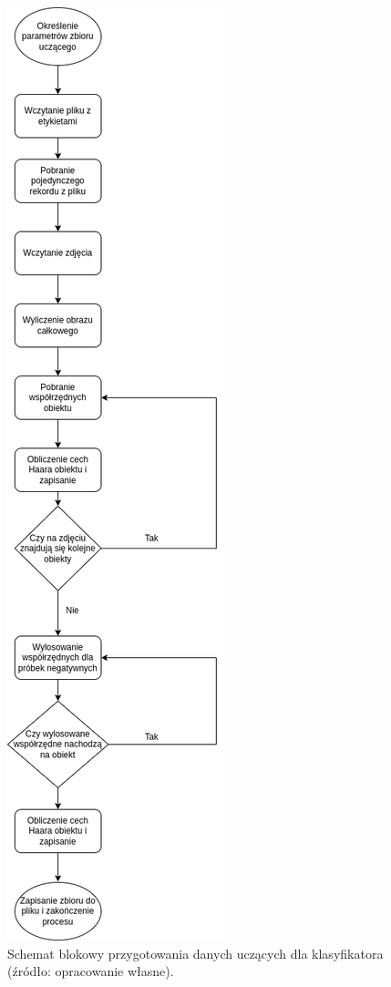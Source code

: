 \begin{figure}[!ht]
    \centering
    \includegraphics[scale=0.4]{Pictures/prepare_haar_dataset}
    \caption{Schemat blokowy przygotowania danych uczących dla klasyfikatora (źródło: opracowanie własne).}
    \label{fig:haar_feats_dataset_prepare}
\end{figure}
